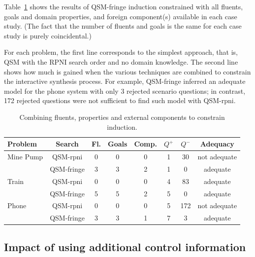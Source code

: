 Table~\ref{All:res} shows the results of QSM-fringe induction constrained with all fluents, goals and domain properties, and foreign component(s) available in each case study. (The fact that the number of fluents and goals is the same for each case study is purely coincidental.)

For each problem, the first line corresponds to the simplest approach, that is, QSM with the RPNI search order and no domain knowledge. The second line shows how much is gained when the various techniques are combined to constrain the interactive synthesis process. For example, QSM-fringe inferred an adequate model for the phone system with only 3 rejected scenario questions; in contrast, 172 rejected questions were not sufficient to find such model with QSM-rpni.

\begin{table}[H]
\centering
\begin{small}
\begin{tabular}{|l||c|c|c|c||c|c|c|}\hline
Problem   & Search      & Fl. & Goals & Comp. &$Q^+$&$Q^-$& Adequacy\\\hline\hline
Mine Pump & QSM-rpni    & 0   & 0     & 0     & 1   & 30  & not adequate\\\cline{2-8}
          & QSM-fringe  & 3   & 3     & 2     & 1   & 0   & adequate\\\hline\hline
Train     & QSM-rpni    & 0   & 0     & 0     & 4   & 83  & adequate\\\cline{2-8}
          & QSM-fringe  & 5   & 5     & 2     & 5   & 0   & adequate\\\hline\hline
Phone     & QSM-rpni    & 0   & 0     & 0     & 5   & 172 & not adequate\\\cline{2-8}
          & QSM-fringe  & 3   & 3     & 1     & 7   & 3   & adequate\\\hline
\end{tabular}
\end{small}
\caption{Combining fluents, properties and external components to constrain induction\label{All:res}.}
\end{table}


\subsection{Impact of using additional control information\label{subsection:evaluation-casestudies-asm}}

